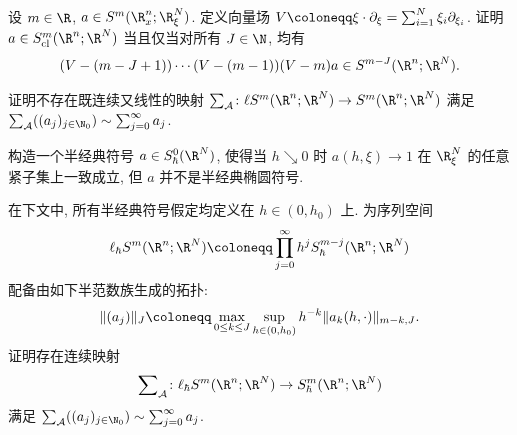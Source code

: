 \begin{exer}\label{ex:3.12}
设 $m \in \R$, $a \in S^m(\R^n_x; \R^N_\xi)$. 定义向量场 $V \defeq \xi \cdot \partial_\xi = \sum_{i=1}^N \xi_i \partial_{\xi_i}$. 证明 $a \in S_{\mathrm{cl}}^m(\R^n; \R^N)$ 当且仅当对所有 $J \in \N$, 均有
\begin{equation}\label{eq:3.68}
    (V - (m - J + 1)) \cdots (V - (m - 1)) (V - m) a \in S^{m-J}(\R^n; \R^N).
\end{equation}
\end{exer}

\begin{exer}[渐近求和的非线性本质]\label{ex:3.13}
证明不存在既连续又线性的映射 $\sum_{\mathcal{A}} \colon \ell S^m(\R^n; \R^N) \to S^m(\R^n; \R^N)$ 满足 $\sum_{\mathcal{A}}((a_j)_{j \in \N_0}) \sim \sum_{j=0}^\infty a_j$.
\end{exer}

\begin{exer}[半经典符号的反常实例]\label{ex:3.14}
构造一个半经典符号 $a \in S_\hbar^0(\R^N)$, 使得当 $h \searrow 0$ 时 $a(h, \xi) \to 1$ 在 $\R^N_\xi$ 的任意紧子集上一致成立, 但 $a$ 并不是半经典椭圆符号.
\end{exer}

\begin{exer}[半经典符号的连续渐近求和]\label{ex:3.15}
在下文中, 所有半经典符号假定均定义在 $h \in (0, h_0)$ 上. 为序列空间
\begin{equation}\label{eq:3.69}
    \ell_\hbar S^m(\R^n; \R^N) \defeq \prod_{j=0}^\infty h^j S_\hbar^{m-j}(\R^n; \R^N)
\end{equation}
配备由如下半范数族生成的拓扑:
\begin{equation}\label{eq:3.70}
    \|(a_j)\|_J \defeq \max_{0 \le k \le J} \sup_{h \in (0, h_0)} h^{-k} \|a_k(h, \cdot)\|_{m-k, J}.
\end{equation}
证明存在连续映射
\begin{equation}\label{eq:3.71}
    \sum\nolimits_{\mathcal{A}} \colon \ell_\hbar S^m(\R^n; \R^N) \to S_\hbar^m(\R^n; \R^N)
\end{equation}
满足 $\sum_{\mathcal{A}}((a_j)_{j \in \N_0}) \sim \sum_{j=0}^\infty a_j$.
\end{exer}
